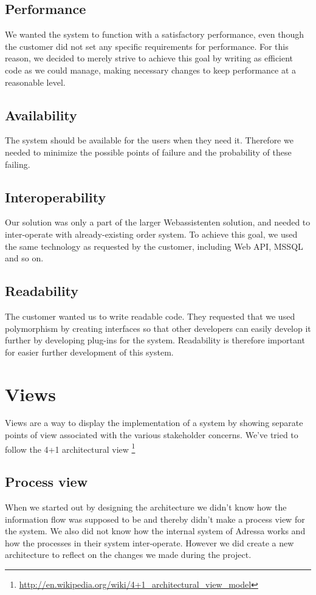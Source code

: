 \subsection{Performance}
We wanted the system to function with a satisfactory performance, even though the customer did not set any specific requirements for performance. For this reason, we decided to merely strive to achieve this goal by writing as efficient code as we could manage, making necessary changes to keep performance at a reasonable level. %

\subsection{Availability}
The system should be available for the users when they need it. Therefore we needed to minimize the possible points of failure and the probability of these failing. %

\subsection{Interoperability}
Our solution was only a part of the larger Webassistenten solution, and needed to inter-operate with already-existing order system. To achieve this goal, we used the same technology as requested by the customer, including Web API, MSSQL and so on.

\subsection{Readability}
The customer wanted us to write readable code. They requested that we used polymorphism by creating interfaces so that other developers can easily develop it further by developing plug-ins for the system. Readability is therefore important for easier further development of this system.


\section{Views}
Views are a way to display the implementation of a system by showing separate points of view associated with the various stakeholder concerns. We've tried to follow the 4+1 architectural view \footnote{\href{http://en.wikipedia.org/wiki/4+1_Architectural_View_Model}{http://en.wikipedia.org/wiki/4+1\_architectural\_view\_model}}
\subsection{Process view}
When we started out by designing the architecture we didn't know how the information flow was supposed to be and thereby didn't make a process view for the system. We also did not know how the internal system of Adressa works and how the processes in their system inter-operate. However we did create a new architecture to reflect on the changes we made during the project. 

